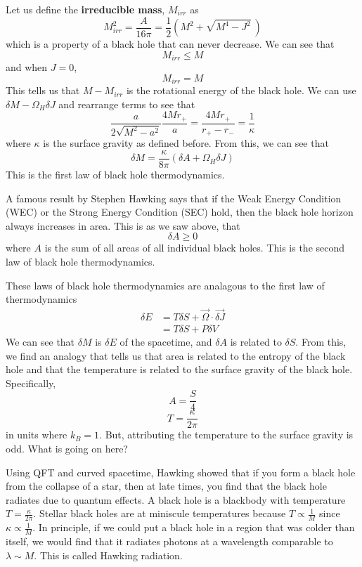 \documentclass[11pt,table]{article}
\begin{document}
Let us define the \textbf{irreducible mass}, $M_{irr}$ as 
\begin{equation}
    M^2_{irr} = \frac{A}{16\pi} = \frac{1}{2}(M^2+\sqrt{M^4-J^2}\:) 
\end{equation}
which is a property of a black hole that can never decrease. We can see that 
\[M_{irr} \leq M\]
and when $J = 0$,
\[M_{irr} = M\]
This tells us that $M - M_{irr}$ is the rotational energy of the black hole. We can use $\delta M-\Omega_H\delta J$ and rearrange terms to see that 
\begin{equation}
    \frac{a}{2\sqrt{M^2-a^2}}\frac{4Mr_+}{a}=\frac{4Mr_+}{r_+-r_-}=\frac{1}{\kappa}
\end{equation}
where $\kappa$ is the surface gravity as defined before. From this, we can see that 
\begin{equation}
    \delta M = \frac{\kappa}{8\pi}(\delta A + \Omega_H\delta J)
\end{equation}
This is the first law of black hole thermodynamics.

A famous result by Stephen Hawking says that if the Weak Energy Condition (WEC) or the Strong Energy Condition (SEC) hold, then the black hole horizon always increases in area. This is as we saw above, that 
\[\delta A \geq 0\]
where $A$ is the sum of all areas of all individual black holes. This is the second law of black hole thermodynamics.

These laws of black hole thermodynamics are analagous to the first law of thermodynamics 
\begin{align*}
    \delta E &= T\delta S + \vec{\Omega}\cdot \vec{\delta J}\\
    &= T\delta S + P\delta V
\end{align*}
We can see that $\delta M$ is $\delta E$ of the spacetime, and $\delta A$ is related to $\delta S$. From this, we find an analogy that tells us that area is related to the entropy of the black hole and that the temperature is related to the surface gravity of the black hole. Specifically, 
\[A = \frac{S}{4}\]
\[T = \frac{\kappa}{2\pi}\]
in units where $k_B = 1$. But, attributing the temperature to the surface gravity is odd. What is going on here?

Using QFT and curved spacetime, Hawking showed that if you form a black hole from the collapse of a star, then at late times, you find that the black hole radiates due to quantum effects. A black hole is a blackbody with temperature $T = \frac{\kappa}{2\pi}$. Stellar black holes are at miniscule temperatures because $T \propto \frac{1}{M}$ since $\kappa \propto \frac{1}{M}$. In principle, if we could put a black hole in a region that was colder than itself, we would find that it radiates photons at a wavelength comparable to $\lambda \sim M$. This is called Hawking radiation.
\end{document}
